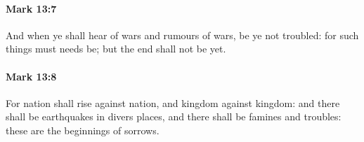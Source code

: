 		\paragraph{Mark 13:7} %
			\label{MARK-13-7}

			And when ye shall hear of wars and rumours of wars, be ye not troubled: for such things must needs be; but the end shall not be yet.

			\begin{framed}
			\scriptsize
				\begin{compactdesc}
					\item[SBLG] 
				\end{compactdesc}
			\end{framed}

		\paragraph{Mark 13:8} %
			\label{MARK-13-8}

			For nation shall rise against nation, and kingdom against kingdom: and there shall be earthquakes in divers places, and there shall be famines and troubles: these are the beginnings of sorrows.

